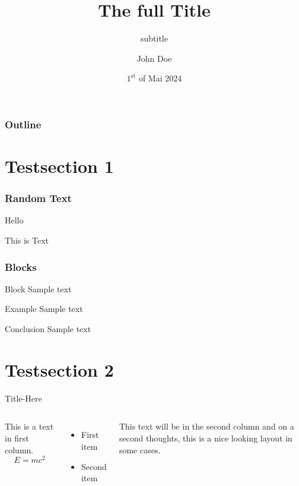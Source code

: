 \documentclass[aspectratio=169]{beamer}
\title[small title]{The full Title}
\subtitle{subtitle}
\author{John Doe}
\institute[TP III]{Chair for theoretical Physics III}
\date[01.05.2024]{$1^{\text{st}}$ of Mai 2024}
\begin{document}
\maketitle

\begin{frame}
    \frametitle{Outline}

    \tableofcontents

\end{frame}

\section{Testsection 1}

\begin{frame}
    \frametitle{Random Text}

    Hello\pause
    
    This is Text
\end{frame}

\begin{frame}
    \frametitle{Blocks}

    \begin{block}{Block}
        Sample text
    \end{block}

    \begin{exampleblock}{Example}
        Sample text
    \end{exampleblock}

    \begin{alertblock}{Conclusion}
        Sample text
    \end{alertblock}
\end{frame}

\section{Testsection 2}

\begin{frame}{Title-Here}
    \begin{columns}
            This is a text in first column.
            $$E=mc^2$$
            \begin{itemize}
                \item First item
                \item Second item
            \end{itemize}
        
            This text will be in the second column
            and on a second thoughts, this is a nice looking
            layout in some cases.
    \end{columns}
\end{frame}
\end{document}

